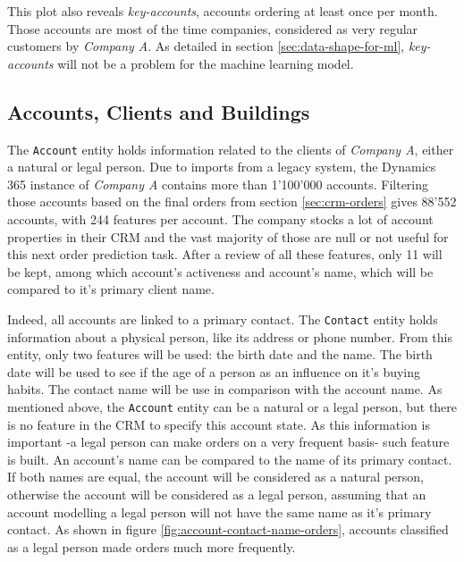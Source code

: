 This plot also reveals \textit{key-accounts}, accounts ordering at least once per month. Those accounts are most of the time companies, considered as very regular customers by \textit{Company A}. As detailed in section \ref{sec:data-shape-for-ml}, \textit{key-accounts} will not be a problem for the machine learning model.


\subsection{Accounts, Clients and Buildings}\label{sec:crm-accounts}
The \texttt{Account} entity holds information related to the clients of \textit{Company A}, either a natural or legal person. Due to imports from a legacy system, the Dynamics 365 instance of \textit{Company A} contains more than 1'100'000 accounts. Filtering those accounts based on the final orders from section \ref{sec:crm-orders} gives 88'552 accounts, with 244 features per account. The company stocks a lot of account properties in their CRM and the vast majority of those are null or not useful for this next order prediction task. After a review of all these features, only 11 will be kept, among which account's activeness and account's name, which will be compared to it's primary client name.

Indeed, all accounts are linked to a primary contact. The \texttt{Contact} entity holds information about a physical person, like its address or phone number. From this entity, only two features will be used: the birth date and the name. The birth date will be used to see if the age of a person as an influence on it's buying habits. The contact name will be use in comparison with the account name. As mentioned above, the \texttt{Account} entity can be a natural or a legal person, but there is no feature in the CRM to specify this account state. As this information is important -a legal person can make orders on a very frequent basis- such feature is built. An account's name can be compared to the name of its primary contact. If both names are equal, the account will be considered as a natural person, otherwise the account will be considered as a legal person, assuming that an account modelling a legal person will not have the same name as it's primary contact. As shown in figure \ref{fig:account-contact-name-orders}, accounts classified as a legal person made orders much more frequently.

